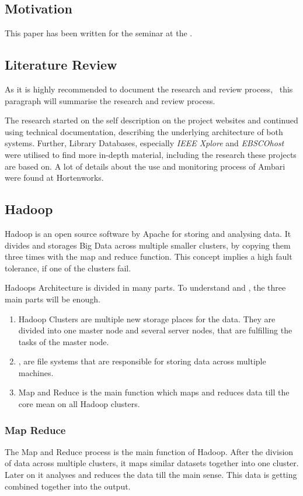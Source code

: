\subsection{Motivation}
This paper has been written for the seminar \isdslong at the \tum. ~\cite{SeminarInfo}

\subsection{Literature Review}
As it is highly recommended to document the research and review process,~\cite{brocke09} this paragraph will summarise the research and review process.

The research started on the self description on the project websites and continued using technical documentation, describing the underlying architecture of both systems.
Further, Library Databases, especially \emph{IEEE Xplore} and \emph{EBSCOhost} were utilised to find more in-depth material, including the research these projects are based on. A lot of details about the use and monitoring process of Ambari were found at Hortenworks.
	
\subsection{Hadoop}
\label{subsec:Hadoop}
Hadoop is an open source software by Apache for storing and analysing data.\cite{Dagli2014} It divides and storages Big Data across multiple smaller clusters, by copying them three times with the map and reduce function. This concept implies a high fault tolerance, if one of the clusters fail.\cite{Dagli2014}

Hadoops Architecture is divided in many parts. To understand \amb and \chuk, the three main parts will be enough.\cite{Dagli2014}
  \begin{enumerate}
  	\item Hadoop Clusters are multiple new storage places for the data. They are divided into one master node and several server nodes, that are fulfilling the tasks of the master node.\cite{Dagli2014}
  	\item \hdfs, are file systems that are responsible for storing data across multiple machines.\cite{Dagli2014}
  	\item Map and Reduce is the main function which maps and reduces data till the core mean on all Hadoop clusters.\cite{Dagli2014}
  \end{enumerate}

\subsubsection*{Map Reduce}
The Map and Reduce process is the main function of Hadoop. After the division of data across multiple clusters, it maps similar datasets together into one cluster. 
Later on it analyses and reduces the data till the main sense. This data is getting combined together into the output. \cite{Dagli2014}

